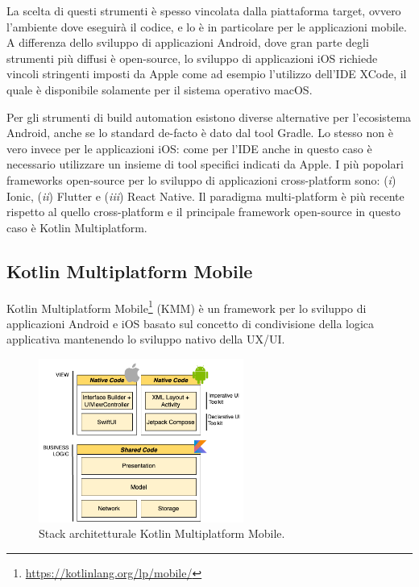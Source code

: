 La scelta di questi strumenti è spesso vincolata dalla piattaforma target, ovvero l'ambiente dove eseguirà il codice, e lo è in particolare per le applicazioni mobile. A differenza dello sviluppo di applicazioni Android, dove gran parte degli strumenti più diffusi è open-source, lo sviluppo di applicazioni iOS richiede vincoli stringenti imposti da Apple come ad esempio l'utilizzo dell'IDE XCode, il quale è disponibile solamente per il sistema operativo macOS.

Per gli strumenti di build automation esistono diverse alternative per l'ecosistema Android, anche se lo standard de-facto è dato dal tool Gradle. Lo stesso non è vero invece per le applicazioni iOS: come per l'IDE anche in questo caso è necessario utilizzare un insieme di tool specifici indicati da Apple. I più popolari frameworks open-source per lo sviluppo di applicazioni cross-platform sono: (\textit{i}) Ionic, (\textit{ii}) Flutter e (\textit{iii}) React Native. Il paradigma multi-platform è più recente rispetto al quello cross-platform e il principale framework open-source in questo caso è Kotlin Multiplatform.

\subsection{Kotlin Multiplatform Mobile}
Kotlin Multiplatform Mobile\footnote{\href{https://kotlinlang.org/lp/mobile/}{https://kotlinlang.org/lp/mobile/}} (KMM) è un framework per lo sviluppo di applicazioni Android e iOS basato sul concetto di condivisione della logica applicativa mantenendo lo sviluppo nativo della UX/UI.

\begin{figure}[H]
    \centering
    \includegraphics[width=0.6\textwidth]{img/stack_kmm.png}
    \caption{Stack architetturale Kotlin Multiplatform Mobile.}
    \label{stackKMM}
\end{figure}

